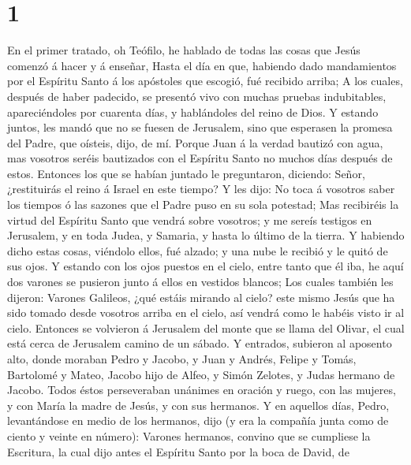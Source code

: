 \hypertarget{section}{%
\section{1}\label{section}}

 En el primer tratado, oh Teófilo, he hablado de todas las
cosas que Jesús comenzó á hacer y á enseñar,  Hasta el día
en que, habiendo dado mandamientos por el Espíritu Santo á los apóstoles
que escogió, fué recibido arriba;  A los cuales, después
de haber padecido, se presentó vivo con muchas pruebas indubitables,
apareciéndoles por cuarenta días, y hablándoles del reino de Dios.
 Y estando juntos, les mandó que no se fuesen de
Jerusalem, sino que esperasen la promesa del Padre, que oísteis, dijo,
de mí.  Porque Juan á la verdad bautizó con agua, mas
vosotros seréis bautizados con el Espíritu Santo no muchos días después
de estos.  Entonces los que se habían juntado le
preguntaron, diciendo: Señor, ¿restituirás el reino á Israel en este
tiempo?  Y les dijo: No toca á vosotros saber los tiempos
ó las sazones que el Padre puso en su sola potestad;  Mas
recibiréis la virtud del Espíritu Santo que vendrá sobre vosotros; y me
sereís testigos en Jerusalem, y en toda Judea, y Samaria, y hasta lo
último de la tierra.  Y habiendo dicho estas cosas,
viéndolo ellos, fué alzado; y una nube le recibió y le quitó de sus
ojos.  Y estando con los ojos puestos en el cielo, entre
tanto que él iba, he aquí dos varones se pusieron junto á ellos en
vestidos blancos;  Los cuales también les dijeron:
Varones Galileos, ¿qué estáis mirando al cielo? este mismo Jesús que ha
sido tomado desde vosotros arriba en el cielo, así vendrá como le habéis
visto ir al cielo.  Entonces se volvieron á Jerusalem del
monte que se llama del Olivar, el cual está cerca de Jerusalem camino de
un sábado.  Y entrados, subieron al aposento alto, donde
moraban Pedro y Jacobo, y Juan y Andrés, Felipe y Tomás, Bartolomé y
Mateo, Jacobo hijo de Alfeo, y Simón Zelotes, y Judas hermano de Jacobo.
 Todos éstos perseveraban unánimes en oración y ruego,
con las mujeres, y con María la madre de Jesús, y con sus hermanos.
 Y en aquellos días, Pedro, levantándose en medio de los
hermanos, dijo (y era la compañía junta como de ciento y veinte en
número):  Varones hermanos, convino que se cumpliese la
Escritura, la cual dijo antes el Espíritu Santo por la boca de David, de
